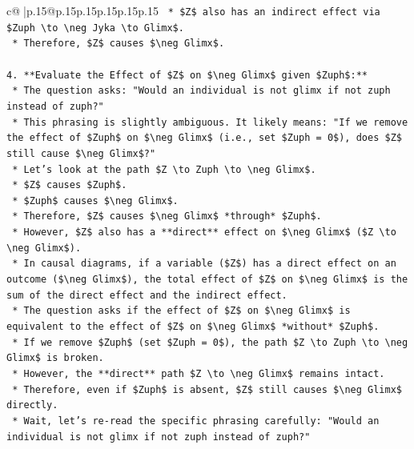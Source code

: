 \documentclass{article}
\begin{document}
{\begin{supertabular}{c@{$\;$}|p{.15\linewidth}@{}p{.15\linewidth}p{.15\linewidth}p{.15\linewidth}p{.15\linewidth}p{.15\linewidth}}
{{{\texttt{    *   \$Z\$ also has an indirect effect via \$Zuph \textbackslash{}to \textbackslash{}neg Jyka \textbackslash{}to Glimx\$.} \\
\texttt{    *   Therefore, \$Z\$ causes \$\textbackslash{}neg Glimx\$.} \\
\\ 
\texttt{4.  **Evaluate the Effect of \$Z\$ on \$\textbackslash{}neg Glimx\$ given \$Zuph\$:**} \\
\texttt{    *   The question asks: "Would an individual is not glimx if not zuph instead of zuph?"} \\
\texttt{    *   This phrasing is slightly ambiguous. It likely means: "If we remove the effect of \$Zuph\$ on \$\textbackslash{}neg Glimx\$ (i.e., set \$Zuph = 0\$), does \$Z\$ still cause \$\textbackslash{}neg Glimx\$?"} \\
\texttt{    *   Let's look at the path \$Z \textbackslash{}to Zuph \textbackslash{}to \textbackslash{}neg Glimx\$.} \\
\texttt{    *   \$Z\$ causes \$Zuph\$.} \\
\texttt{    *   \$Zuph\$ causes \$\textbackslash{}neg Glimx\$.} \\
\texttt{    *   Therefore, \$Z\$ causes \$\textbackslash{}neg Glimx\$ *through* \$Zuph\$.} \\
\texttt{    *   However, \$Z\$ also has a **direct** effect on \$\textbackslash{}neg Glimx\$ (\$Z \textbackslash{}to \textbackslash{}neg Glimx\$).} \\
\texttt{    *   In causal diagrams, if a variable (\$Z\$) has a direct effect on an outcome (\$\textbackslash{}neg Glimx\$), the total effect of \$Z\$ on \$\textbackslash{}neg Glimx\$ is the sum of the direct effect and the indirect effect.} \\
\texttt{    *   The question asks if the effect of \$Z\$ on \$\textbackslash{}neg Glimx\$ is equivalent to the effect of \$Z\$ on \$\textbackslash{}neg Glimx\$ *without* \$Zuph\$.} \\
\texttt{    *   If we remove \$Zuph\$ (set \$Zuph = 0\$), the path \$Z \textbackslash{}to Zuph \textbackslash{}to \textbackslash{}neg Glimx\$ is broken.} \\
\texttt{    *   However, the **direct** path \$Z \textbackslash{}to \textbackslash{}neg Glimx\$ remains intact.} \\
\texttt{    *   Therefore, even if \$Zuph\$ is absent, \$Z\$ still causes \$\textbackslash{}neg Glimx\$ directly.} \\
\texttt{    *   Wait, let's re{-}read the specific phrasing carefully: "Would an individual is not glimx if not zuph instead of zuph?"} \\
}}}
\end{supertabular}}
\end{document}
